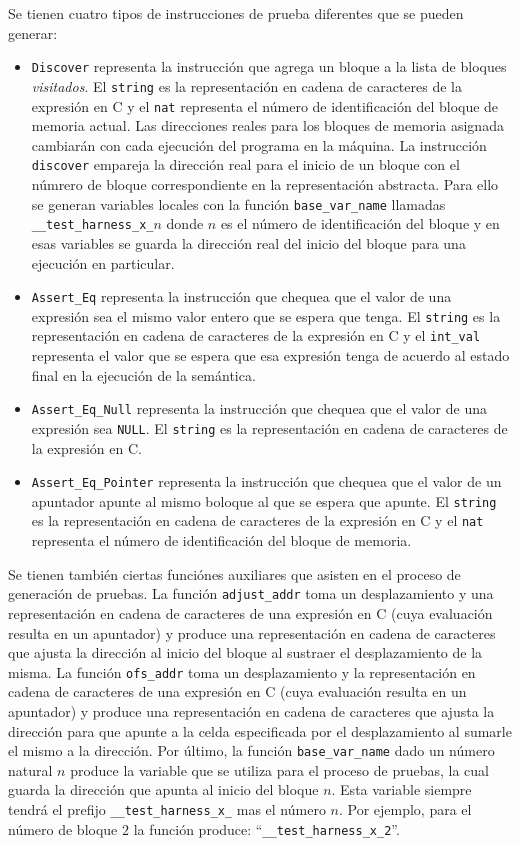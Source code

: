 Se tienen cuatro tipos de instrucciones de prueba diferentes que se pueden generar:

\begin{itemize}
  \item{\verb|Discover| representa la instrucción que agrega un bloque a la lista de bloques \textit{visitados}.
  El \verb|string| es la representación en cadena de caracteres de la expresión en C y el \verb|nat| representa el número de identificación del bloque de memoria actual.
  Las direcciones reales para los bloques de memoria asignada cambiarán con cada ejecución del programa en la máquina.
  La instrucción \verb|discover| empareja la dirección real para el inicio de un bloque con el númrero de bloque correspondiente en la representación abstracta.
  Para ello se generan variables locales con la función \verb|base_var_name| llamadas \verb|__test_harness_x_|$n$ donde $n$ es el número de identificación del bloque y en esas variables se guarda la dirección real del inicio del bloque para una ejecución en particular.}
  \item{\verb|Assert_Eq| representa la instrucción que chequea que el valor de una expresión sea el mismo valor entero que se espera que tenga.
  El \verb|string| es la representación en cadena de caracteres de la expresión en C y el \verb|int_val| representa el valor que se espera que esa expresión tenga de acuerdo al estado final en la ejecución de la semántica.}
  \item{\verb|Assert_Eq_Null| representa la instrucción que chequea que el valor de una expresión sea \verb|NULL|.
  El \verb|string| es la representación en cadena de caracteres de la expresión en C.}
  \item{\verb|Assert_Eq_Pointer| representa la instrucción que chequea que el valor de un apuntador apunte al mismo boloque al que se espera que apunte.
  El \verb|string| es la representación en cadena de caracteres de la expresión en C y el \verb|nat| representa el número de identificación del bloque de memoria.}
\end{itemize}

Se tienen también ciertas funciónes auxiliares que asisten en el proceso de generación de pruebas.
La función \verb|adjust_addr| toma un desplazamiento y una representación en cadena de caracteres de una expresión en C (cuya evaluación resulta en un apuntador) y produce una representación en cadena de caracteres que ajusta la dirección al inicio del bloque al sustraer el desplazamiento de la misma.
La función \verb|ofs_addr| toma un desplazamiento y la representación en cadena de caracteres de una expresión en C (cuya evaluación resulta en un apuntador) y produce una representación en cadena de caracteres que ajusta la dirección para que apunte a la celda especificada por el desplazamiento al sumarle el mismo a la dirección.
Por último, la función \verb|base_var_name| dado un número natural $n$ produce la variable que se utiliza para el proceso de pruebas, la cual guarda la dirección que apunta al inicio del bloque $n$.
Esta variable siempre tendrá el prefijo \verb|__test_harness_x_| mas el número $n$.
Por ejemplo, para el número de bloque $2$ la función produce: ``\verb|__test_harness_x_2|''.


